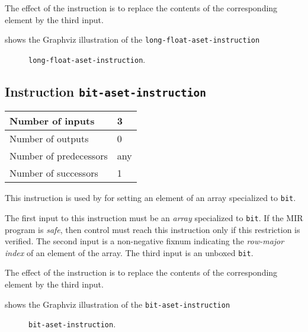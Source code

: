 The effect of the instruction is to replace the contents of the
corresponding element by the third input.

 shows the Graphviz illustration of the
\texttt{long-float-aset-instruction}

\begin{figure}
\begin{center}
\end{center}
\caption{\label{fig-long-float-aset-instruction}
\texttt{long-float-aset-instruction}.}
\end{figure}

\subsection{Instruction \texttt{bit-aset-instruction}}
\label{mir-instruction-bit-aset}

\begin{tabular}{|l|l|}
\hline
Number of inputs & 3\\
\hline
Number of outputs & 0\\
\hline
Number of predecessors & any\\
\hline
Number of successors & 1\\
\hline
\end{tabular}

This instruction is used by for setting an element of an array
specialized to \texttt{bit}.

The first input to this instruction must be an \emph{array}
specialized to \texttt{bit}.  If the MIR program is
\emph{safe}, then control must reach this instruction only if this
restriction is verified.  The second input is a non-negative fixnum
indicating the \emph{row-major index} of an element of the array.  
The third input is an unboxed \texttt{bit}.

The effect of the instruction is to replace the contents of the
corresponding element by the third input.

 shows the Graphviz illustration of the
\texttt{bit-aset-instruction}

\begin{figure}
\begin{center}
\end{center}
\caption{\label{fig-bit-aset-instruction}
\texttt{bit-aset-instruction}.}
\end{figure}


